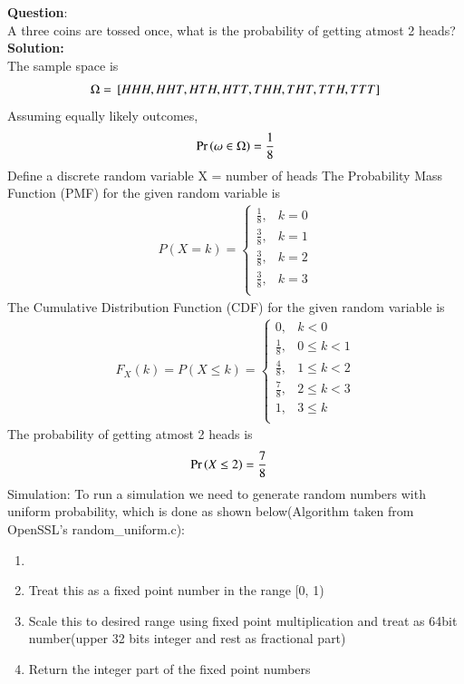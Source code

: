 \documentclass[journal]{IEEEtran}
\begin{document}
\textbf{Question}:\\
A three coins are tossed once, what is the probability of getting atmost 2 heads?
\\
\textbf{Solution: }\\
The sample space is 
\begin{align}
  \Omega = {}\left[HHH, HHT, HTH, HTT, THH, THT, TTH, TTT\right]
\end{align}
Assuming equally likely outcomes, 
\begin{align}
  \Pr\left(\omega \in \Omega\right) = \frac{1}{8}
\end{align}
Define a discrete random variable X = number of heads\newline
The Probability Mass Function (PMF) for the given random variable is
\begin{align}
P(X = k) =
\begin{cases}
	\frac{1}{8}, & k = 0 \\
	\frac{3}{8}, & k = 1 \\
	\frac{3}{8}, & k = 2 \\
	\frac{3}{8}, & k = 3 \\
\end{cases}
\end{align}
The Cumulative Distribution Function (CDF) for the given random variable is
\begin{align}
F_X(k) = P(X \le k) = 
\begin{cases}
	0, & k < 0 \\
	\frac{1}{8}, & 0 \le k < 1 \\
	\frac{4}{8}, & 1 \le k < 2 \\
	\frac{7}{8}, & 2 \le k < 3 \\
	1, & 3 \le k\\
\end{cases}
\end{align}
The probability of getting atmost 2 heads is
\begin{align}
  \Pr\left(X \le 2\right) &= \frac{7}{8}
\end{align}
Simulation:
\newline
To run a simulation we need to generate random numbers with uniform probability, which is done
as shown below(Algorithm taken from OpenSSL's random\_uniform.c):
\begin{enumerate}
  \item {}
  \item Treat this as a fixed point number in the range [0, 1)
  \item Scale this to desired range using fixed point multiplication and treat as 64bit number(upper 32 bits integer and rest as fractional part)
  \item Return the integer part of the fixed point numbers
\end{enumerate}
\end{document}

